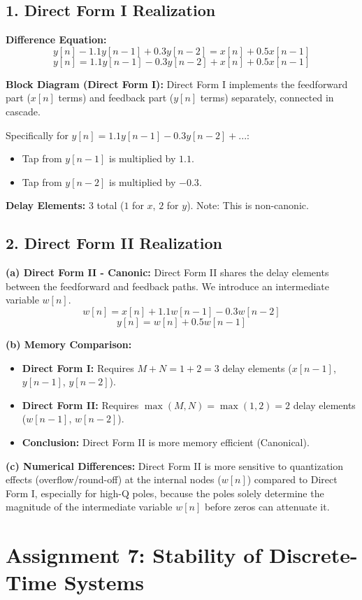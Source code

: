 \documentclass[11pt, a4paper]{article}
\begin{document}
\subsection{1. Direct Form I Realization}
\textbf{Difference Equation:}
$$y[n] - 1.1y[n-1] + 0.3y[n-2] = x[n] + 0.5x[n-1]$$
$$y[n] = 1.1y[n-1] - 0.3y[n-2] + x[n] + 0.5x[n-1]$$

\textbf{Block Diagram (Direct Form I):}
Direct Form I implements the feedforward part ($x[n]$ terms) and feedback part ($y[n]$ terms) separately, connected in cascade.

Specifically for $y[n] = 1.1y[n-1] - 0.3y[n-2] + ...$:
\begin{itemize}
    \item Tap from $y[n-1]$ is multiplied by $1.1$.
    \item Tap from $y[n-2]$ is multiplied by $-0.3$.
\end{itemize}

\textbf{Delay Elements:} 3 total ($1$ for $x$, $2$ for $y$). Note: This is non-canonic.

\subsection{2. Direct Form II Realization}
\textbf{(a) Direct Form II - Canonic:}
Direct Form II shares the delay elements between the feedforward and feedback paths. We introduce an intermediate variable $w[n]$.
$$w[n] = x[n] + 1.1w[n-1] - 0.3w[n-2]$$
$$y[n] = w[n] + 0.5w[n-1]$$

\textbf{(b) Memory Comparison:}
\begin{itemize}
    \item \textbf{Direct Form I:} Requires $M + N = 1 + 2 = 3$ delay elements ($x[n-1]$, $y[n-1]$, $y[n-2]$).
    \item \textbf{Direct Form II:} Requires $\max(M, N) = \max(1, 2) = 2$ delay elements ($w[n-1]$, $w[n-2]$).
    \item \textbf{Conclusion:} Direct Form II is more memory efficient (Canonical).
\end{itemize}

\textbf{(c) Numerical Differences:}
Direct Form II is more sensitive to quantization effects (overflow/round-off) at the internal nodes ($w[n]$) compared to Direct Form I, especially for high-Q poles, because the poles solely determine the magnitude of the intermediate variable $w[n]$ before zeros can attenuate it.

\newpage
\section{Assignment 7: Stability of Discrete-Time Systems}
\end{document}
